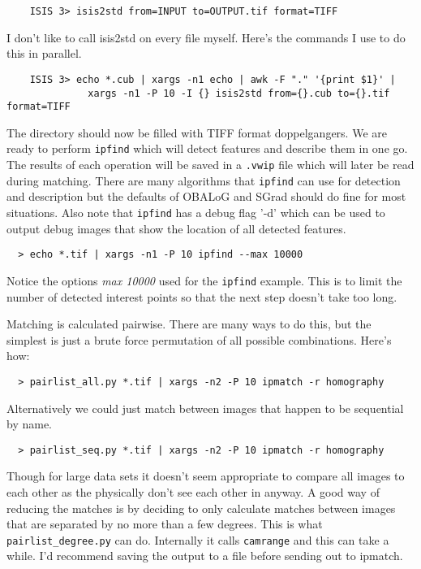 \begin{verbatim}
    ISIS 3> isis2std from=INPUT to=OUTPUT.tif format=TIFF
\end{verbatim}

I don't like to call isis2std on every file myself. Here's the
commands I use to do this in parallel.

\begin{verbatim}
    ISIS 3> echo *.cub | xargs -n1 echo | awk -F "." '{print $1}' |
              xargs -n1 -P 10 -I {} isis2std from={}.cub to={}.tif format=TIFF
\end{verbatim}

The directory should now be filled with TIFF format doppelgangers. We
are ready to perform \texttt{ipfind} which will detect features and
describe them in one go. The results of each operation will be saved
in a \texttt{.vwip} file which will later be read during
matching. There are many algorithms that \texttt{ipfind} can use for
detection and description but the defaults of OBALoG and SGrad should
do fine for most situations. Also note that \texttt{ipfind} has a
debug flag '-d' which can be used to output debug images that show the
location of all detected features.

\begin{verbatim}
  > echo *.tif | xargs -n1 -P 10 ipfind --max 10000
\end{verbatim}

Notice the options \emph{\-\-max 10000} used for the \texttt{ipfind}
example. This is to limit the number of detected interest points so
that the next step doesn't take too long.

Matching is calculated pairwise. There are many ways to do this, but
the simplest is just a brute force permutation of all possible
combinations. Here's how:

\begin{verbatim}
  > pairlist_all.py *.tif | xargs -n2 -P 10 ipmatch -r homography
\end{verbatim}

Alternatively we could just match between images that happen to be
sequential by name.

\begin{verbatim}
  > pairlist_seq.py *.tif | xargs -n2 -P 10 ipmatch -r homography
\end{verbatim}

Though for large data sets it doesn't seem appropriate to compare all
images to each other as the physically don't see each other in
anyway. A good way of reducing the matches is by deciding to only
calculate matches between images that are separated by no more than a
few degrees. This is what \texttt{pairlist\_degree.py} can
do. Internally it calls \texttt{camrange} and this can take a
while. I'd recommend saving the output to a file before sending out to
ipmatch.

